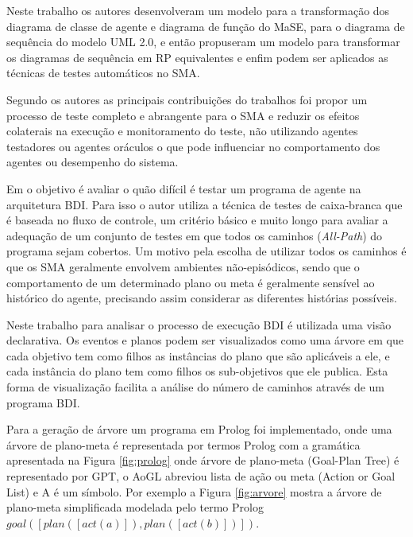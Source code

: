 Neste trabalho os autores desenvolveram um modelo para a transformação dos diagrama de classe de agente e diagrama de função do MaSE, para o diagrama de sequência do modelo UML 2.0, e então propuseram um modelo para transformar os diagramas de sequência em RP equivalentes e enfim podem ser aplicados as técnicas de testes automáticos no SMA.

Segundo os autores as principais contribuições do trabalhos foi propor um processo de teste completo e abrangente para o SMA e reduzir os efeitos colaterais na execução e monitoramento do teste, não utilizando agentes testadores ou agentes oráculos o que pode influenciar no comportamento dos agentes ou desempenho do sistema.


Em \cite{winikoff2014testability} o objetivo é avaliar o quão difícil é testar um programa de agente na arquitetura BDI. Para isso o autor utiliza a técnica de testes de caixa-branca que é baseada no fluxo de controle, um critério básico e muito longo para avaliar a adequação de um conjunto de testes em que todos os caminhos (\textit{All-Path}) do programa sejam cobertos. Um motivo pela escolha de utilizar todos os caminhos é que os SMA geralmente envolvem ambientes não-episódicos, sendo que o comportamento de um determinado plano ou meta é geralmente sensível ao histórico do agente, precisando assim considerar as diferentes histórias possíveis.

Neste trabalho para analisar o processo de execução BDI é utilizada uma visão declarativa. Os eventos e planos podem ser visualizados como uma árvore em que cada objetivo tem como filhos as instâncias do plano que são aplicáveis a ele, e cada instância do plano tem como filhos os sub-objetivos que ele publica. Esta forma de visualização facilita a análise do número de caminhos através de um programa BDI.

Para a geração de árvore um programa em Prolog foi implementado, onde uma árvore de plano-meta é representada por termos Prolog com a gramática apresentada na Figura \ref{fig:prolog} onde árvore de plano-meta (Goal-Plan Tree) é representado por GPT, o AoGL abreviou lista de ação ou meta (Action or Goal List) e A é um símbolo. Por exemplo a Figura \ref{fig:arvore} mostra a árvore de plano-meta simplificada modelada pelo termo Prolog \begin{math} goal\left ( \left [ plan\left ( \left [ act\left ( a \right ) \right ] \right ),plan\left ( \left [ act\left ( b \right ) \right ] \right ) \right ] \right )\end{math}.

